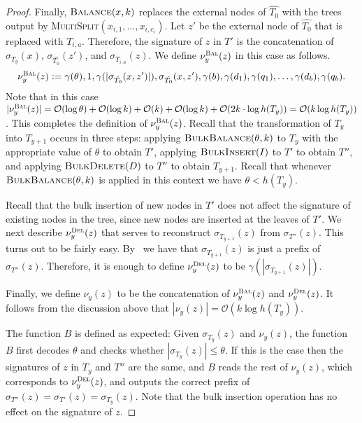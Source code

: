 \documentclass[kpfonts]{patmorin}
\newcommand{\Oh}{\mathcal{O}}
\let\leq\leqslant
\begin{document}
\begin{proof}
  Finally, $\textsc{Balance}(x,k)$ replaces the external nodes of $\hat{T_0}$ with the trees output by \textsc{MultiSplit}$(x_{i,1},\ldots,x_{i,c_i})$.
  Let $z'$ be the external node of $\hat{T_0}$ that is replaced with $T_{i,a}$.
  Therefore, the signature of $z$ in $T'$ is the concatenation of $\sigma_{T_y}(x)$, $\sigma_{\hat{T_0}}(z')$, and $\sigma_{T_{i,a}}(z)$.
  We define $\nu^{\textsc{Bal}}_y(z)$ in this case as follows.
    \[
  \nu^{\textsc{Bal}}_y(z) := \gamma(\theta),1,\gamma(|\sigma_{\hat{T_0}}(x,z')|),\sigma_{\hat{T_0}}(x,z'),\gamma(b),
  \gamma(d_1),\gamma(q_1),\ldots,\gamma(d_b),\gamma(q_b).
  \]
  Note that in this case $|\nu^{\textsc{Bal}}_y(z)|=\Oh(\log\theta) + \Oh(\log k) + \Oh(k) + \Oh(\log k) + \Oh(2k\cdot\log h(T_y))=\Oh(k\log h(T_y))$.
  This completes the definition of $\nu^{\textsc{Bal}}_y(z)$.  Recall that the transformation of $T_{y}$ into $T_{y+1}$ occurs in three steps:
  applying $\textsc{BulkBalance}(\theta,k)$ to $T_y$ with the appropriate value of $\theta$ to obtain $T'$,
  applying $\textsc{BulkInsert}(I)$ to $T'$ to obtain $T''$, and
  applying $\textsc{BulkDelete}(D)$ to $T''$ to obtain $T_{y+1}$.
  Recall that whenever $\textsc{BulkBalance}(\theta,k)$ is applied in this context we have $\theta < h(T_y)$.


 Recall that the bulk insertion of new nodes in $T'$ does not affect the signature of existing nodes in the tree, since new nodes are inserted at the leaves of $T'$. We next describe $\nu^{\textsc{Del}}_y(z)$ that serves to reconstruct $\sigma_{T_{y+1}}(z)$ from $\sigma_{T''}(z)$.
  This turns out to be fairly easy.
  By~ we have that $\sigma_{T_{y+1}}(z)$ is just a prefix of $\sigma_{T''}(z)$.
  Therefore, it is enough to define $\nu^{\textsc{Del}}_y(z)$ to be $\gamma(|\sigma_{T_{y+1}}(z)|)$.

  Finally, we define $\nu_y(z)$ to be the concatenation of $\nu^{\textsc{Bal}}_y(z)$ and $\nu^{\textsc{Del}}_y(z)$.
  It follows from the discussion above that $|\nu_y(z)| = \Oh(k\log h(T_y))$.

  The function $B$ is defined as expected:
  Given $\sigma_{T_{y}}(z)$ and $\nu_y(z)$, the function $B$ first decodes $\theta$ and checks whether $|\sigma_{T_y}(z)| \leq \theta$. If this is the case then the signatures of $z$ in $T_{y}$ and $T''$ are the same, and $B$ reads the rest of $\nu_y(z)$, which corresponds to $\nu^{\textsc{Del}}_y(z)$, and outputs the correct prefix of $\sigma_{T''}(z) = \sigma_{T'}(z) =\sigma_{T_{y}}(z)$.
  Note that the bulk insertion operation has no effect on the signature of $z$.


\end{proof}
\end{document}
